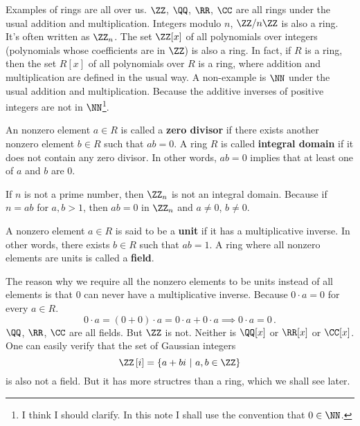 \documentclass[11pt]{scrartcl}
\begin{document}
Examples of rings are all over us. \(\ZZ\), \(\QQ\), \(\RR\), \(\CC\) are all rings under the usual addition and multiplication. Integers modulo \(n\), \(\ZZ / n\ZZ\) is also a ring. It's often written as \(\ZZ_n\). The set \(\ZZ [x]\) of all polynomials over integers (polynomials whose coefficients are in \(\ZZ\)) is also a ring. In fact, if \(R\) is a ring, then the set \(R[x]\) of all polynomials over \(R\) is a ring, where addition and multiplication are defined in the usual way. A non-example is \(\NN\) under the usual addition and multiplication. Because the additive inverses of positive integers are not in \(\NN\)\footnote{I think I should clarify. In this note I shall use the convention that \(0 \in \NN\).}.

\begin{defn}
An nonzero element \(a \in R\) is called a \textbf{zero divisor} if there exists another nonzero element \(b \in R\) such that \(a b = 0\). A ring \(R\) is called \textbf{integral domain} if it does not contain any zero divisor. In other words, \(ab = 0\) implies that at least one of \(a\) and \(b\) are \(0\).
\end{defn}
If \(n\) is not a prime number, then \(\ZZ_n\) is not an integral domain. Because if \(n = ab\) for \(a,b > 1\), then \(a b = 0\) in \(\ZZ_n\) and \(a \ne 0\), \(b \ne 0\).
\begin{defn}
A nonzero element \(a \in R\) is said to be a \textbf{unit} if it has a multiplicative inverse. In other words, there exists \(b \in R\) such that \(ab=1\). A ring where all nonzero elements are units is called a \textbf{field}.
\end{defn}
The reason why we require all the nonzero elements to be units instead of all elements is that \(0\) can never have a multiplicative inverse. Because \(0 \cdot a = 0\) for every \(a \in R\).
\[ 0 \cdot a = \left(0 + 0\right) \cdot a = 0 \cdot a + 0 \cdot a \implies 0 \cdot a = 0 \,. \]
\(\QQ\), \(\RR\), \(\CC\) are all fields. But \(\ZZ\) is not. Neither is \(\QQ [x]\) or \(\RR [x]\) or \(\CC [x]\). One can easily verify that the set of Gaussian integers
\[ \ZZ \left[i\right] = \left\{a + bi \ | \ a,b \in \ZZ\right\}  \]
is also not a field. But it has more structres than a ring, which we shall see later.
\end{document}
